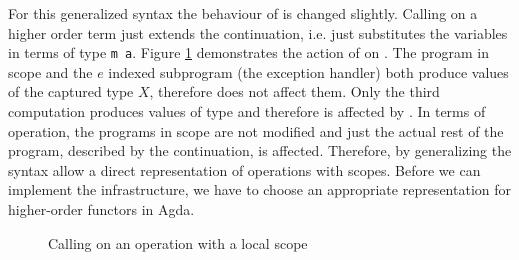 For this generalized syntax the behaviour of \AgdaFunction{>>=} is changed
slightly.
Calling \AgdaFunction{>>=} on a higher order term just extends the continuation,
i.e. just substitutes the variables in terms of type \texttt{m a}.
Figure \ref{higher-order:syntax:bind} demonstrates the action of
\AgdaFunction{>>=} on .
The program in scope and the $e$ indexed subprogram (the exception handler) both
produce values of the captured type $X$, therefore \AgdaFunction{>>=} does not
affect them.
Only the third computation produces values of type  and
therefore is affected by \AgdaFunction{>>=}.
In terms of operation, the programs in scope are not modified and just the
actual rest of the program, described by the continuation, is affected.
Therefore, by generalizing the syntax \textcite{DBLP:conf/haskell/WuSH14} allow
a direct representation of operations with scopes.
Before we can implement the infrastructure, we have to choose an appropriate
representation for higher-order functors in Agda.

\begin{figure}
  \begin{center}
  \end{center}
  \caption{Calling \bind{} on an operation with a local scope}
  \label{higher-order:syntax:bind}
\end{figure}


